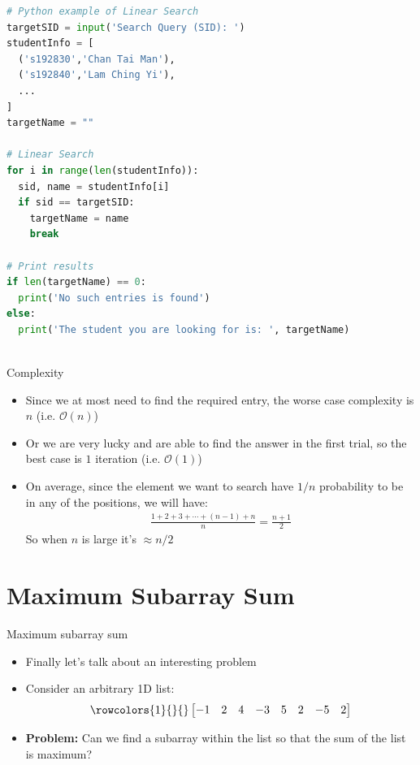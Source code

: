 \documentclass[10pt,xcolor={table,dvipsnames},t]{beamer}
\begin{document}
\begin{frame}[fragile]
\begin{lstlisting}[language=python]
# Python example of Linear Search
targetSID = input('Search Query (SID): ')
studentInfo = [
  ('s192830','Chan Tai Man'),
  ('s192840','Lam Ching Yi'),
  ...
]
targetName = ""

# Linear Search
for i in range(len(studentInfo)):
  sid, name = studentInfo[i]
  if sid == targetSID:
    targetName = name 
    break 

# Print results
if len(targetName) == 0:
  print('No such entries is found')
else:
  print('The student you are looking for is: ', targetName)
  

\end{lstlisting}
\end{frame}

\begin{frame}{Complexity}
  \begin{itemize}
    \item Since we at most need to find the required entry, the worse case complexity is $n$ (i.e. $\mathcal{O}(n)$)
    \item Or we are very lucky and are able to find the answer in the first trial, so the best case is $1$ iteration (i.e. $\mathcal{O}(1)$)
    \item On average, since the element we want to search have $1/n$ probability to be in any of the positions, we will have:
    \begin{align*}
      \frac{1+2+3+\cdots+(n-1)+n}{n} = \frac{n+1}{2}
    \end{align*}
    So when $n$ is large it's $\approx n/2$
  \end{itemize}
\end{frame}

\section{Maximum Subarray Sum}
\begin{frame}{Maximum subarray sum}
  \begin{itemize}
    \item Finally let's talk about an interesting problem 
    \item Consider an arbitrary 1D list:
    \begin{align*}
      \rowcolors{1}{}{}
      \begin{bmatrix}
        -1 & 2 & 4 & -3 & 5 & 2 & -5 & 2
      \end{bmatrix}
    \end{align*}
    \item \textbf{Problem:} Can we find a subarray within the list so that the sum of the list is maximum?
  \end{itemize}
\end{frame}
\end{document}
